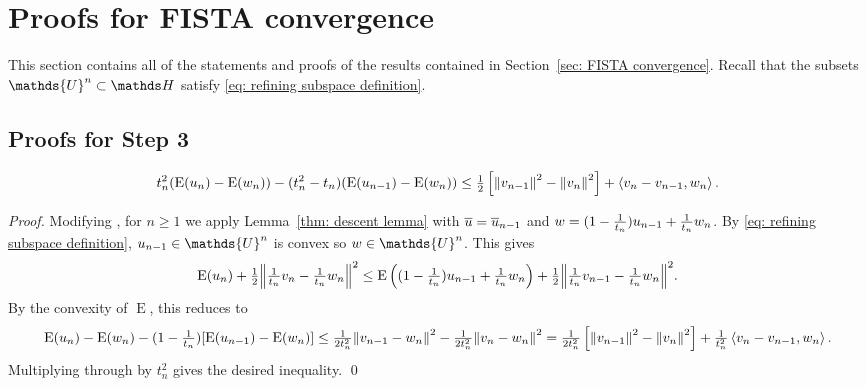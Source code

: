\documentclass[smallextended]{svjour3}
\let\F\mathds\let\C\mathcal\newcommand{\R}{\F{R}}\newcommand{\A}{\tens{A}}
\newcommand{\norm}[1]{{\left\lVert #1 \right\rVert}}
\newcommand{\IP}[2]{\left\langle #1,#2 \right\rangle}
\newcommand{\op}[1]{\operatorname{#1}}
\newcommand{\1}{\F{1}}
\newcommand*{\varf}[1]{%
	\IfEqCase{#1}{%
		{0}{u}%
		{1}{v}%
		{2}{w}%
	}[u#1]%
}
\newcommand*{\spcf}[1]{%
	\IfEqCase{#1}{%
		{0}{\F{U}}%
		{1}{\F{V}}%
		{2}{\F{W}}%
	}[\F{U}#1]%
}
\newcommand{\edit}[2]{{\ifmmode\text{\color{red}\sout{\ensuremath{#1}}}\else {\color{red} \sout{#1}}\fi} {\color{darkgreen} #2}}
\begin{document}
	\section{Proofs for FISTA convergence}\label{app: FISTA convergence}
	This section contains all of the statements and proofs of the results contained in Section~\ref{sec: FISTA convergence}. \edit{}{Recall that the subsets $\spcf0^n\subset\F H$ satisfy \eqref{eq: refining subspace definition}.}
	
	\subsection{Proofs for Step 3}
	
	\begin{theorem}\label{app:thm: one step FISTA}
		\begin{equation}
			t_{n}^2(\op{E}(\varf0_{n}) - \op{E}(\varf2_n)) - (t_{n}^2-t_{n})(\op{E}(\varf0_{n-1})-\op{E}(\varf2_n)) \leq \tfrac1{2}\left[\norm{\varf1_{n-1}}^2-\norm{\varf1_{n}}^2\right] + \IP{\varf1_{n}-\varf1_{n-1}}{\varf2_n}.
			\label{app:eq: one-step FISTA}
		\end{equation}
	\end{theorem}
	\begin{proof}
		Modifying \cite[\edit{Theorem 2}{Thm 3.2}]{Chambolle2015}, for $n\geq1$ we apply Lemma~\ref{thm: descent lemma} with $\bar{\varf0} = \bar{\varf0}_{n-1}$ and $\varf2 = (1-\frac{1}{t_{n}})\varf0_{n-1} + \frac{1}{t_{n}}\varf2_n$. \edit{}{By \eqref{eq: refining subspace definition}, $\varf0_{n-1}\in\spcf0^n$ is convex so $\varf2\in \spcf0^n$. }This gives
		\begin{equation}
			\op{E}(\varf0_{n}) + \tfrac12\norm{\tfrac{1}{t_{n}}\varf1_{n}-\tfrac{1}{t_{n}}\varf2_n}^2 \leq \op{E}\left((1-\tfrac{1}{t_{n}})\varf0_{n-1}+\tfrac{1}{t_{n}}\varf2_n\right) + \tfrac12\norm{\tfrac{1}{t_{n}}\varf1_{n-1}-\tfrac{1}{t_{n}}\varf2_n}^2.
		\end{equation}
		By the convexity of $\op{E}$, this reduces to
		\begin{equation}
			\op{E}(\varf0_{n}) - \op{E}(\varf2_n) - (1-\tfrac{1}{t_{n}})[\op{E}(\varf0_{n-1})-\op{E}(\varf2_n)] \leq \tfrac1{2t_{n}^2}\norm{\varf1_{n-1}-\varf2_n}^2 - \tfrac1{2t_{n}^2}\norm{\varf1_{n}-\varf2_n}^2 = \tfrac1{2t_{n}^2}\left[\norm{\varf1_{n-1}}^2-\norm{\varf1_{n}}^2\right] + \tfrac1{t_{n}^2}\IP{\varf1_{n}-\varf1_{n-1}}{\varf2_n}.
		\end{equation}
		\edit{}{Multiplying through by $t_n^2$ gives the desired inequality.}
		\qed\end{proof}
	
\end{document}
